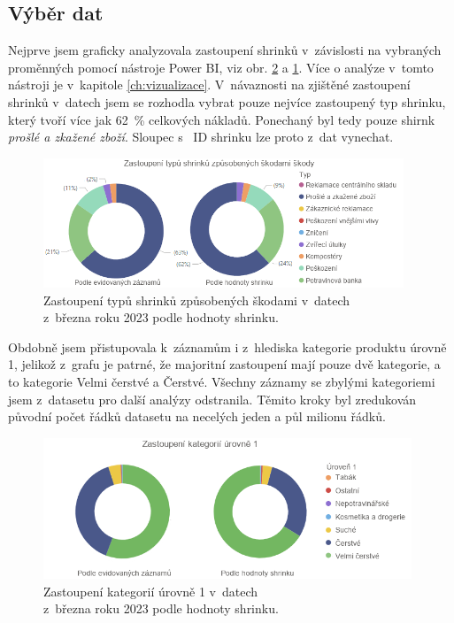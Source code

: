 \subsection{Výběr dat}

Nejprve jsem graficky analyzovala zastoupení shrinků v~závislosti na vybraných proměnných pomocí nástroje Power BI, viz obr. \ref*{obr:rok:g:zastoupeni1} a \ref*{obr:rok:g:zastoupenish1}. Více o analýze v~tomto nástroji je v~kapitole \ref{ch:vizualizace}. V~návaznosti na zjištěné zastoupení shrinků v~datech jsem se rozhodla vybrat pouze nejvíce zastoupený typ shrinku, který tvoří více jak 62~\% celkových nákladů. Ponechaný byl tedy pouze shirnk \emph{prošlé a zkažené zboží}. Sloupec s~ ID shrinku lze proto z~dat vynechat.

\begin{figure}[h!]
    \centering
    \captionsetup{justification=centering}
    \includegraphics[width=0.96\textwidth]{obrazky/grafy/zastoupenishrinky.png}
    \caption{Zastoupení typů shrinků způsobených škodami v~datech \\ z~března roku 2023 podle hodnoty shrinku.}
    \label{obr:rok:g:zastoupenish1}
\end{figure}

Obdobně jsem přistupovala k~záznamům i z~hlediska kategorie produktu úrovně 1, jelikož z~grafu je patrné, že majoritní zastoupení mají pouze dvě kategorie, a to kategorie Velmi čerstvé a Čerstvé. Všechny záznamy se zbylými kategoriemi jsem z~datasetu pro další analýzy odstranila. Těmito kroky byl zredukován původní počet řádků datasetu na %
necelých jeden a půl milionu řádků.

\begin{figure}[h!]
    \centering
    \captionsetup{justification=centering}
    \includegraphics[width=0.98\textwidth]{obrazky/grafy/zastoupeniL1.png}
    \caption{Zastoupení kategorií úrovně 1 v~datech \\ z~března roku 2023 podle hodnoty shrinku.}
    \label{obr:rok:g:zastoupeni1}
\end{figure}

